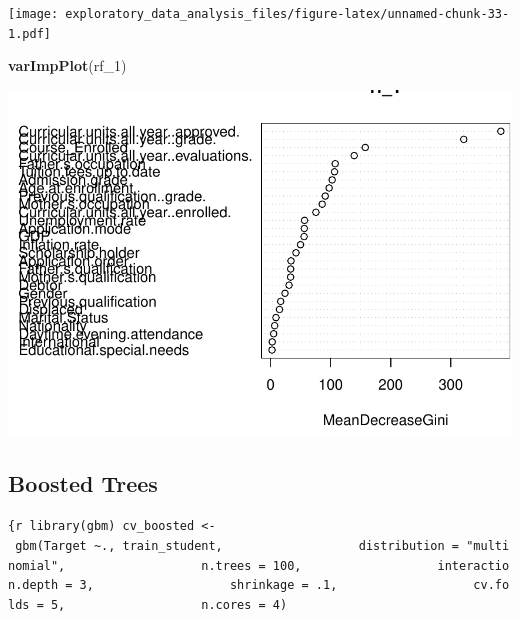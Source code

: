 \documentclass[
]{article}
\newenvironment{Shaded}{\begin{snugshade}}{\end{snugshade}}
\newcommand{\FunctionTok}[1]{\textcolor[rgb]{0.13,0.29,0.53}{\textbf{#1}}}
\newcommand{\NormalTok}[1]{#1}
\begin{document}
\texttt{[image: exploratory\_data\_analysis\_files/figure-latex/unnamed-chunk-33-1.pdf]}

\begin{Shaded}
\begin{Highlighting}[]
\FunctionTok{varImpPlot}\NormalTok{(rf\_1)}
\end{Highlighting}
\end{Shaded}

\includegraphics{exploratory_data_analysis_files/figure-latex/unnamed-chunk-34-1.pdf}

\hypertarget{boosted-trees}{%
\subsection{Boosted Trees}\label{boosted-trees}}

\texttt{\{r\ library(gbm)\ cv\_boosted\ \textless{}-\ gbm(Target\ \textasciitilde{}.,\ train\_student,\ \ \ \ \ \ \ \ \ \ \ \ \ \ \ \ \ \ \ distribution\ =\ "multinomial",\ \ \ \ \ \ \ \ \ \ \ \ \ \ \ \ \ \ \ n.trees\ =\ 100,\ \ \ \ \ \ \ \ \ \ \ \ \ \ \ \ \ \ \ interaction.depth\ =\ 3,\ \ \ \ \ \ \ \ \ \ \ \ \ \ \ \ \ \ \ shrinkage\ =\ .1,\ \ \ \ \ \ \ \ \ \ \ \ \ \ \ \ \ \ \ cv.folds\ =\ 5,\ \ \ \ \ \ \ \ \ \ \ \ \ \ \ \ \ \ \ n.cores\ =\ 4)}
\end{document}
